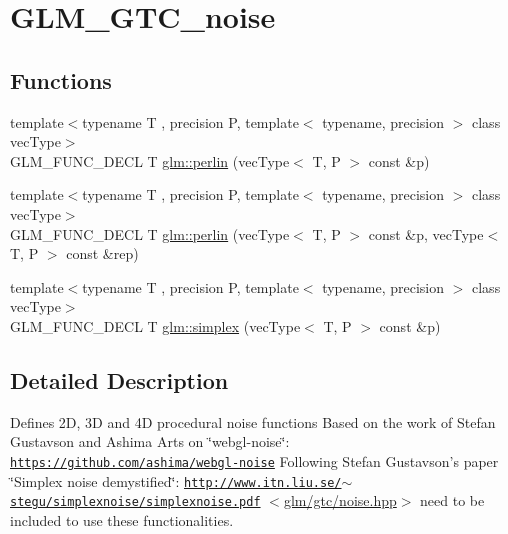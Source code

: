 \hypertarget{group__gtc__noise}{\section{G\-L\-M\-\_\-\-G\-T\-C\-\_\-noise}
\label{group__gtc__noise}
}
\subsection*{Functions}
\begin{DoxyCompactItemize}
\item 
{\footnotesize template$<$typename T , precision P, template$<$ typename, precision $>$ class vec\-Type$>$ }\\G\-L\-M\-\_\-\-F\-U\-N\-C\-\_\-\-D\-E\-C\-L T \hyperlink{group__gtc__noise_ga14e5975486b2b36e747861d3c65b16c1}{glm\-::perlin} (vec\-Type$<$ T, P $>$ const \&p)
\item 
{\footnotesize template$<$typename T , precision P, template$<$ typename, precision $>$ class vec\-Type$>$ }\\G\-L\-M\-\_\-\-F\-U\-N\-C\-\_\-\-D\-E\-C\-L T \hyperlink{group__gtc__noise_ga7e103ffffacb322fe2d4863c372ae2fd}{glm\-::perlin} (vec\-Type$<$ T, P $>$ const \&p, vec\-Type$<$ T, P $>$ const \&rep)
\item 
{\footnotesize template$<$typename T , precision P, template$<$ typename, precision $>$ class vec\-Type$>$ }\\G\-L\-M\-\_\-\-F\-U\-N\-C\-\_\-\-D\-E\-C\-L T \hyperlink{group__gtc__noise_ga05f5ab240c9a3fdeee353636e464c285}{glm\-::simplex} (vec\-Type$<$ T, P $>$ const \&p)
\end{DoxyCompactItemize}


\subsection{Detailed Description}
Defines 2\-D, 3\-D and 4\-D procedural noise functions Based on the work of Stefan Gustavson and Ashima Arts on \char`\"{}webgl-\/noise\char`\"{}\-: \href{https://github.com/ashima/webgl-noise}{\tt https\-://github.\-com/ashima/webgl-\/noise} Following Stefan Gustavson's paper \char`\"{}\-Simplex noise demystified\char`\"{}\-: \href{http://www.itn.liu.se/~stegu/simplexnoise/simplexnoise.pdf}{\tt http\-://www.\-itn.\-liu.\-se/$\sim$stegu/simplexnoise/simplexnoise.\-pdf} $<$\hyperlink{noise_8hpp}{glm/gtc/noise.\-hpp}$>$ need to be included to use these functionalities. 

